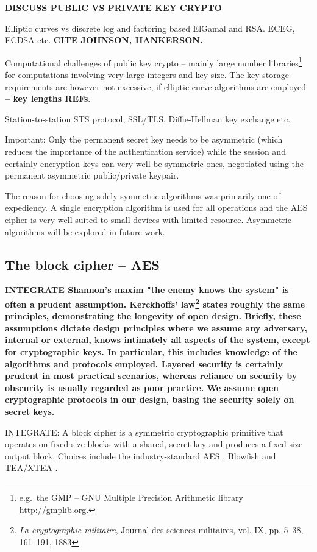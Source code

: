 \textbf{DISCUSS PUBLIC VS PRIVATE KEY CRYPTO}

Elliptic curves vs discrete log and factoring based ElGamal and RSA. ECEG, ECDSA etc. \textbf{CITE JOHNSON, HANKERSON.}

Computational challenges of public key crypto -- mainly large number libraries\footnote{e.g.\ the GMP -- GNU Multiple Precision Arithmetic library \url{http://gmplib.org}.} for computations involving very large integers and key size. The key storage requirements are however not excessive, if elliptic curve algorithms are employed \textbf{-- key lengths REFs}.

Station-to-station STS protocol, SSL/TLS, Diffie-Hellman key exchange etc.

Important: Only the permanent secret key needs to be asymmetric (which reduces the importance of the authentication service) while the session and certainly encryption keys can very well be symmetric ones, negotiated using the permanent asymmetric public/private keypair.

The reason for choosing solely symmetric algorithms was primarily one of expediency. A single encryption algorithm is used for all operations and the AES cipher is very well suited to small devices with limited resource. Asymmetric algorithms will be explored in future work.

\subsection{The block cipher -- AES}

\textbf{INTEGRATE
Shannon's maxim "the enemy knows the system" is often a prudent assumption. Kerckhoffs' law\footnote{\textit{La cryptographie militaire}, Journal des sciences militaires, vol. IX, pp. 5--38, 161–191, 1883} states roughly the same principles, demonstrating the longevity of open design. Briefly, these assumptions dictate design principles where we assume any adversary, internal or external, knows intimately all aspects of the system, except for cryptographic keys. In particular, this includes knowledge of the algorithms and protocols employed. Layered security is certainly prudent in most practical scenarios, whereas reliance on security by obscurity is usually regarded as poor practice. We assume open cryptographic protocols in our design, basing the security solely on secret keys.}

INTEGRATE:
A block cipher is a symmetric cryptographic primitive that operates on fixed-size blocks with a shared, secret key and produces a fixed-size output block. Choices include the industry-standard AES , Blowfish  and TEA/XTEA .

